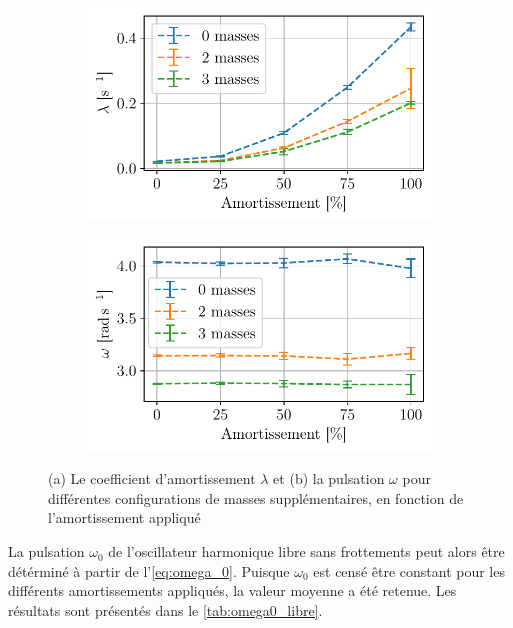 \begin{figure}[h]
    \centering
    \begin{subfigure}{0.48\linewidth}
        \centering
        \includegraphics[width=\linewidth]{figures/lambda_nomot.pdf}
        \caption{}
        \label{fig:lambda_libre}
    \end{subfigure}
    \begin{subfigure}{0.48\linewidth}
        \centering
        \includegraphics[width=\linewidth]{figures/omega_nomot.pdf}
        \caption{}
        \label{fig:omega_libre}
    \end{subfigure}
    \caption{(a) Le coefficient d'amortissement \(\lambda\) et (b) la pulsation \(\omega\) pour différentes configurations de masses supplémentaires, en fonction de l'amortissement appliqué}
\end{figure}

La pulsation \(\omega_0\) de l'oscillateur harmonique libre sans frottements peut alors être détérminé à partir de l'\autoref{eq:omega_0}. Puisque \(\omega_0\) est censé être constant pour les différents amortissements appliqués, la valeur moyenne a été retenue. Les résultats sont présentés dans le \autoref{tab:omega0_libre}.

